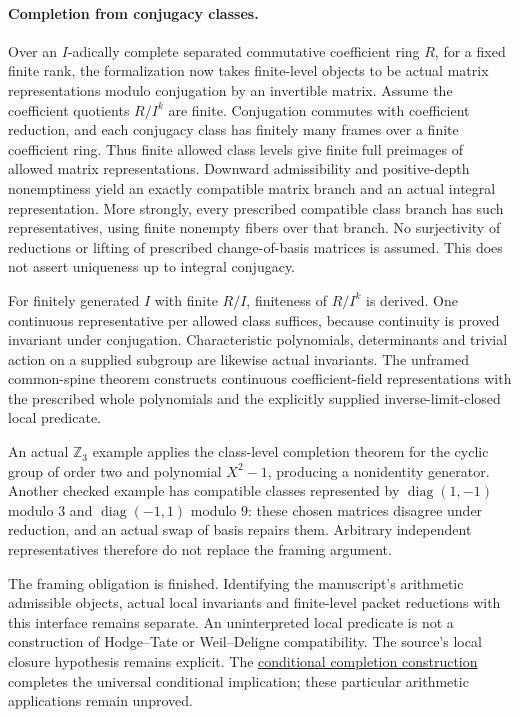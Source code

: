 \documentclass[11pt]{article}
\theoremstyle{definition}
\theoremstyle{remark}
\begin{document}
\paragraph{Completion from conjugacy classes.}\label{book:x-construction-14}
Over an $I$-adically complete separated commutative coefficient ring $R$,
for a fixed finite rank, the formalization now takes finite-level objects to be
actual matrix representations modulo conjugation by an invertible matrix.
Assume the coefficient quotients $R/I^k$ are finite.
Conjugation commutes with coefficient reduction, and each conjugacy class has
finitely many frames over a finite coefficient ring. Thus finite allowed class
levels give finite full preimages of allowed matrix representations. Downward
admissibility and positive-depth nonemptiness yield an exactly compatible
matrix branch and an actual integral representation. More strongly, every
prescribed compatible class branch has such representatives, using finite
nonempty fibers over that branch. No surjectivity of reductions or lifting of
prescribed change-of-basis matrices is assumed. This does not assert uniqueness
up to integral conjugacy.

For finitely generated $I$ with finite $R/I$, finiteness of $R/I^k$ is derived.
One continuous representative per allowed class suffices, because continuity
is proved invariant under conjugation. Characteristic polynomials, determinants
and trivial action on a supplied subgroup are likewise actual invariants.
The unframed common-spine theorem constructs continuous coefficient-field
representations with the prescribed whole polynomials and the explicitly
supplied inverse-limit-closed local predicate.

An actual $\mathbb Z_3$ example applies the class-level completion theorem
for the cyclic group of order two and polynomial $X^2-1$, producing a nonidentity generator. Another
checked example has compatible classes represented by
$\operatorname{diag}(1,-1)$ modulo $3$ and
$\operatorname{diag}(-1,1)$ modulo $9$: these chosen matrices disagree under
reduction, and an actual swap of basis repairs them. Arbitrary independent
representatives therefore do not replace the framing argument.

The framing obligation is finished. Identifying the manuscript's arithmetic
admissible objects, actual local invariants and finite-level packet reductions
with this interface remains separate. An uninterpreted local predicate is not
a construction of Hodge--Tate or Weil--Deligne compatibility. The source's local
closure hypothesis remains explicit. The \hyperref[book:x-construction-23]{conditional completion construction} completes the universal
conditional implication; these particular arithmetic applications remain
unproved.
\end{document}

